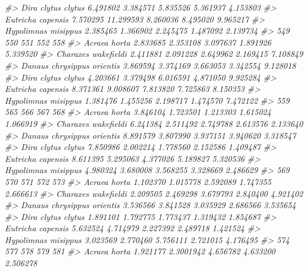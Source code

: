 \documentclass[
]{article}
\newenvironment{Shaded}{\begin{snugshade}}{\end{snugshade}}
\newcommand{\CommentTok}[1]{\textcolor[rgb]{0.56,0.35,0.01}{\textit{#1}}}
\begin{document}
\begin{Shaded}
\begin{Highlighting}[]
\CommentTok{\#\textgreater{} Dira clytus clytus         6.491802  3.384571 5.835526 5.361937 4.153803}
\CommentTok{\#\textgreater{} Eutricha capensis          7.570295 11.299593 8.260036 8.495020 9.965217}
\CommentTok{\#\textgreater{} Hypolimnas misippus        2.385465  1.366902 2.245475 1.487092 2.139734}
\CommentTok{\#\textgreater{}                                 549      550      551      552      558}
\CommentTok{\#\textgreater{} Acraea horta               2.833685 2.353108 3.097637 1.891926 5.339520}
\CommentTok{\#\textgreater{} Charaxes wakefieldi        2.411881 2.091228 2.649962 2.169415 7.108849}
\CommentTok{\#\textgreater{} Danaus chrysippus orientis 3.869594 3.374169 3.663053 3.342554 9.128018}
\CommentTok{\#\textgreater{} Dira clytus clytus         4.203661 3.379498 6.016591 4.871050 9.925284}
\CommentTok{\#\textgreater{} Eutricha capensis          8.371361 9.008607 7.813820 7.725863 8.150353}
\CommentTok{\#\textgreater{} Hypolimnas misippus        1.381476 1.455256 2.198717 1.474570 7.472122}
\CommentTok{\#\textgreater{}                                 559      565      566      567      568}
\CommentTok{\#\textgreater{} Acraea horta               3.846104 1.723501 1.213303 1.615024 1.066919}
\CommentTok{\#\textgreater{} Charaxes wakefieldi        6.241384 2.511492 2.749788 2.613576 2.133640}
\CommentTok{\#\textgreater{} Danaus chrysippus orientis 8.891579 3.807990 3.937151 3.940620 3.318547}
\CommentTok{\#\textgreater{} Dira clytus clytus         7.850986 2.002214 1.778560 2.152586 1.409487}
\CommentTok{\#\textgreater{} Eutricha capensis          8.611395 5.295063 4.377026 5.189827 5.320536}
\CommentTok{\#\textgreater{} Hypolimnas misippus        4.980324 3.680008 3.568255 3.328669 2.486629}
\CommentTok{\#\textgreater{}                                 569      570      571      572      573}
\CommentTok{\#\textgreater{} Acraea horta               1.102370 1.015778 2.592089 1.747355 2.666613}
\CommentTok{\#\textgreater{} Charaxes wakefieldi        2.209505 2.469298 3.679793 2.840400 4.921402}
\CommentTok{\#\textgreater{} Danaus chrysippus orientis 3.536566 3.841528 3.035929 2.686566 3.535654}
\CommentTok{\#\textgreater{} Dira clytus clytus         1.891101 1.792775 1.773437 1.319432 1.854687}
\CommentTok{\#\textgreater{} Eutricha capensis          5.632524 4.714979 2.227392 2.489718 1.421524}
\CommentTok{\#\textgreater{} Hypolimnas misippus        3.023569 2.770460 5.756111 2.721015 4.176495}
\CommentTok{\#\textgreater{}                                 574       577      578      579      581}
\CommentTok{\#\textgreater{} Acraea horta               1.921177 2.3001942 4.656782 4.633200 2.506278}

\end{Highlighting}
\end{Shaded}
\end{document}
